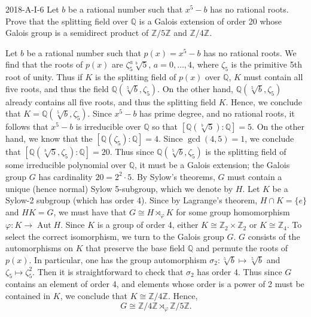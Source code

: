 \documentclass{article}
\begin{document}
	\begin{prb}{2018-A-I-6}
		Let $b$ be a rational number such that $x^{5} - b$ has no rational roots. Prove that the splitting field over $\mathbb{Q}$ is a Galois extension of order 20 whose Galois group is a semidirect product of $\mathbb{Z}/5\mathbb{Z}$ and $\mathbb{Z}/4\mathbb{Z}$. 	
	\end{prb}
	Let $b$ be a rational number such that $p(x) = x^{5} - b$ has no rational roots. We find that the roots of $p(x)$ are $\zeta_{5}^{a}\sqrt[b]{5}$, $a = 0, \ldots, 4$, where $\zeta_{5}$ is the primitive 5th root of unity. Thus if $K$ is the splitting field of $p(x)$ over $\mathbb{Q}$, $K$ must contain all five roots, and thus the field $\mathbb{Q}(\sqrt[5]{b}, \zeta_{5})$. On the other hand, $\mathbb{Q}(\sqrt[5]{b}, \zeta_{5})$ already contains all five roots, and thus the splitting field $K$. Hence, we conclude that $K = \mathbb{Q}(\sqrt[5]{b}, \zeta_{5})$. Since $x^{5} - b$ has prime degree, and no rational roots, it follows that $x^{5} - b$ is irreducible over $\mathbb{Q}$ so that $[\mathbb{Q}(\sqrt[b]{5}):\mathbb{Q}] = 5$. On the other hand, we know that the $[\mathbb{Q}(\zeta_5): \mathbb{Q}] = 4$. Since $\gcd(4,5) = 1$, we conclude that $[\mathbb{Q}(\sqrt[b]{5},\zeta_5): \mathbb{Q}] = 20$. Thus since $\mathbb{Q}(\sqrt[5]{b},\zeta_5)$ is the splitting field of some irreducible polynomial over $\mathbb{Q}$, it must be a Galois extension; the Galois group $G$ has cardinality $20 = 2^{2} \cdot 5$. By Sylow's theorems, $G$ must contain a unique (hence normal) Sylow 5-subgroup, which we denote by $H$. Let $K$ be a Sylow-2 subgroup (which has order 4). Since by Lagrange's theorem, $H \cap K = \{e\}$ and $HK = G$, we must have that $G \cong H \rtimes_{\varphi} K$ for some group homomorphism $\varphi: K \to \operatorname{Aut}{H}$. Since $K$ is a group of order 4, either $K \cong \mathbb{Z}_{2} \times \mathbb{Z}_{2}$ or $K \cong \mathbb{Z}_{4}$. To select the correct isomorphism, we turn to the Galois group $G$. $G$ consists of the automorphisms on $K$ that preserve the base field $\mathbb{Q}$ and permute the roots of $p(x)$. In particular, one has the group automorphism $\sigma_{2}: \sqrt[5]{b} \mapsto \sqrt[5]{b}$ and $\zeta_{5} \mapsto \zeta_{5}^{2}$. Then it is straightforward to check that $\sigma_{2}$ has order 4. Thus since $G$ contains an element of order 4, and elements whose order is a power of 2 must be contained in $K$, we conclude that $K \cong \mathbb{Z}/4\mathbb{Z}$. Hence, 
	\begin{equation*}
		G \cong \mathbb{Z}/4\mathbb{Z} \rtimes_{\varphi} \mathbb{Z}/5\mathbb{Z}. 
	\end{equation*}
	
\end{document}
